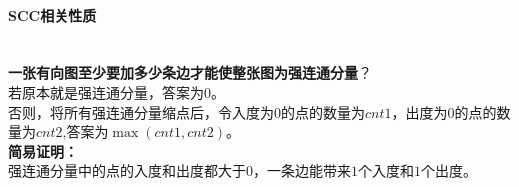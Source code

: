 \paragraph{SCC相关性质}~{}
\\
\textbf{一张有向图至少要加多少条边才能使整张图为强连通分量}？\\
若原本就是强连通分量，答案为$0$。\\
否则，将所有强连通分量缩点后，令入度为$0$的点的数量为$cnt1$，出度为$0$的点的数量为$cnt2$,答案为$\max(cnt1, cnt2)$。\\
\textbf{简易证明：}\\
强连通分量中的点的入度和出度都大于$0$，一条边能带来$1$个入度和$1$个出度。
